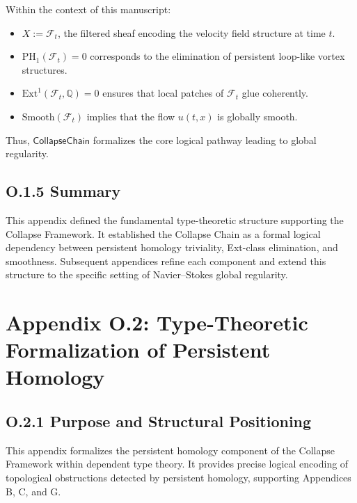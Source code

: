 \documentclass[11pt]{article}
\begin{document}
Within the context of this manuscript:

\begin{itemize}
  \item \( X := \mathcal{F}_t \), the filtered sheaf encoding the velocity field structure at time \( t \).
  \item \( \mathrm{PH}_1(\mathcal{F}_t) = 0 \) corresponds to the elimination of persistent loop-like vortex structures.
  \item \( \mathrm{Ext}^1(\mathcal{F}_t, \mathbb{Q}) = 0 \) ensures that local patches of \( \mathcal{F}_t \) glue coherently.
  \item \( \mathrm{Smooth}(\mathcal{F}_t) \) implies that the flow \( u(t, x) \) is globally smooth.
\end{itemize}

Thus, \( \textsf{CollapseChain} \) formalizes the core logical pathway leading to global regularity.

\subsection*{O.1.5 Summary}

This appendix defined the fundamental type-theoretic structure supporting the Collapse Framework.  
It established the Collapse Chain as a formal logical dependency between persistent homology triviality, Ext-class elimination, and smoothness.  
Subsequent appendices refine each component and extend this structure to the specific setting of Navier–Stokes global regularity.



\section*{Appendix O.2: Type-Theoretic Formalization of Persistent Homology}

\subsection*{O.2.1 Purpose and Structural Positioning}

This appendix formalizes the persistent homology component of the Collapse Framework within dependent type theory.  
It provides precise logical encoding of topological obstructions detected by persistent homology, supporting Appendices B, C, and G.
\end{document}
